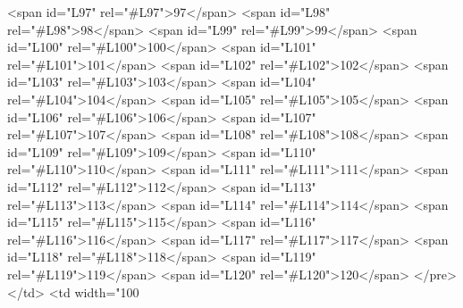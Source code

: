 <span id="L97" rel="#L97">97</span>
<span id="L98" rel="#L98">98</span>
<span id="L99" rel="#L99">99</span>
<span id="L100" rel="#L100">100</span>
<span id="L101" rel="#L101">101</span>
<span id="L102" rel="#L102">102</span>
<span id="L103" rel="#L103">103</span>
<span id="L104" rel="#L104">104</span>
<span id="L105" rel="#L105">105</span>
<span id="L106" rel="#L106">106</span>
<span id="L107" rel="#L107">107</span>
<span id="L108" rel="#L108">108</span>
<span id="L109" rel="#L109">109</span>
<span id="L110" rel="#L110">110</span>
<span id="L111" rel="#L111">111</span>
<span id="L112" rel="#L112">112</span>
<span id="L113" rel="#L113">113</span>
<span id="L114" rel="#L114">114</span>
<span id="L115" rel="#L115">115</span>
<span id="L116" rel="#L116">116</span>
<span id="L117" rel="#L117">117</span>
<span id="L118" rel="#L118">118</span>
<span id="L119" rel="#L119">119</span>
<span id="L120" rel="#L120">120</span>
</pre>
          </td>
          <td width="100%
